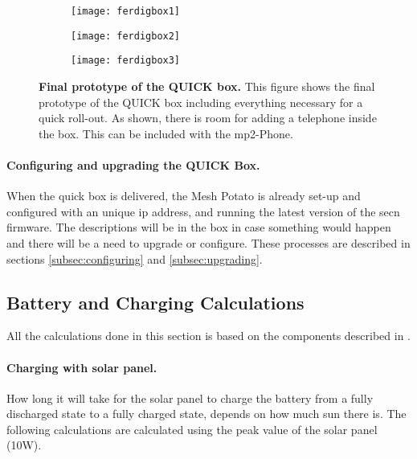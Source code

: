 \begin{figure}
        \centering
        \begin{subfigure}[t]{0.4\textwidth}
                \texttt{[image: ferdigbox1]}
                \label{fig:ferdigbox1}
        \end{subfigure}
        \begin{subfigure}[t]{0.4\textwidth}
                \texttt{[image: ferdigbox2]}
                \label{fig:ferdigbox2}
        \end{subfigure}
         \begin{subfigure}[t]{0.81\textwidth}
                \texttt{[image: ferdigbox3]} 
                \label{fig:ferdigbox3}
        \end{subfigure}
\caption[Final prototype of the QUICK box]{\textbf{Final prototype of the QUICK box.} This figure shows the final prototype of the QUICK box including everything necessary for a quick roll-out. As shown, there is room for adding a telephone inside the box. This can be included with the \gls{mp2}-Phone.} \label{fig:ferdigbox}
\end{figure}


\paragraph{Configuring and upgrading the QUICK Box.}
When the \gls{quick} box is delivered, the Mesh Potato is already set-up and configured with an unique \gls{ip} address, and running the latest version of the \gls{secn} firmware. The descriptions will be in the box in case something would happen and there will be a need to upgrade or configure. These processes are described in sections \ref{subsec:configuring} and \ref{subsec:upgrading}.

\clearpage

\subsection{Battery and Charging Calculations}
All the calculations done in this section is based on the components described in . 

\paragraph{Charging with solar panel.}
How long it will take for the solar panel to charge the battery from a fully discharged state to a fully charged state, depends on how much sun there is. The following calculations are calculated using the peak value of the solar panel (10W). 

